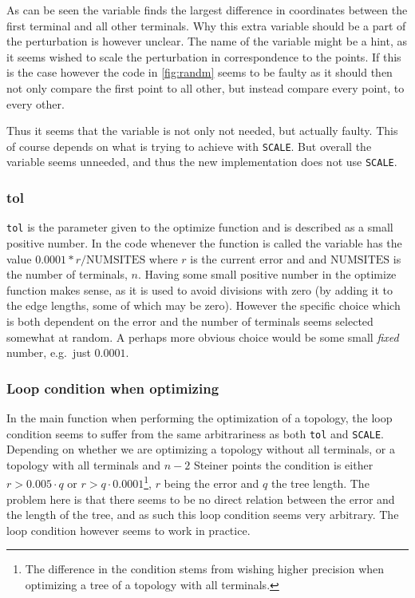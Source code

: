 As can be seen the variable finds the largest difference in coordinates between the first
terminal and all other terminals. Why this extra variable should be a part of
the perturbation is however unclear. The name of the variable might be a hint,
as it seems \citeauthor{smith1992} wished to scale the perturbation in correspondence to the
points. If this is the case however the code in \cref{fig:randm} seems to be
faulty as it should then not only compare the first point to all other, but
instead compare every point, to every other.

Thus it seems that the variable is not only not needed, but actually faulty.
This of course depends on what \citeauthor{smith1992} is trying to achieve with \texttt{SCALE}.
But overall the variable seems unneeded, and thus the new implementation does
not use \texttt{SCALE}.

\subsubsection{tol}
\label{sec:tol}

\texttt{tol} is the parameter given to the optimize function and is described as
a small positive number. In the code whenever the function is called the
variable has the value $0.0001*r/\text{NUMSITES}$ where $r$ is the current
error and and $\text{NUMSITES}$ is the number of terminals, $n$. Having some
small positive number in the optimize function makes sense, as it is used to
avoid divisions with zero (by adding it to the edge lengths, some of which may
be zero). However the specific choice which is both dependent on the error and
the number of terminals seems selected somewhat at random. A perhaps more
obvious choice would be some small \textit{fixed} number, e.g.\ just
$0.0001$.

\subsubsection{Loop condition when optimizing}
\label{sec:loop-condition-when-1}

In the main function when performing the optimization of a topology, the loop
condition seems to suffer from the same arbitrariness as both \texttt{tol} and
\texttt{SCALE}. Depending on whether we are optimizing a topology without all
terminals, or a topology with all terminals and $n-2$ Steiner points the
condition is either $r > 0.005 \cdot q$ or $r > q \cdot 0.0001$\footnote{The
  difference in the condition stems from wishing higher precision when
  optimizing a tree of a topology with all terminals.}, $r$ being the error and
$q$ the tree length. The problem here is that there seems to be no direct relation
between the error and the length of the tree, and as such this loop condition
seems very arbitrary. The loop condition however seems to work in practice.


